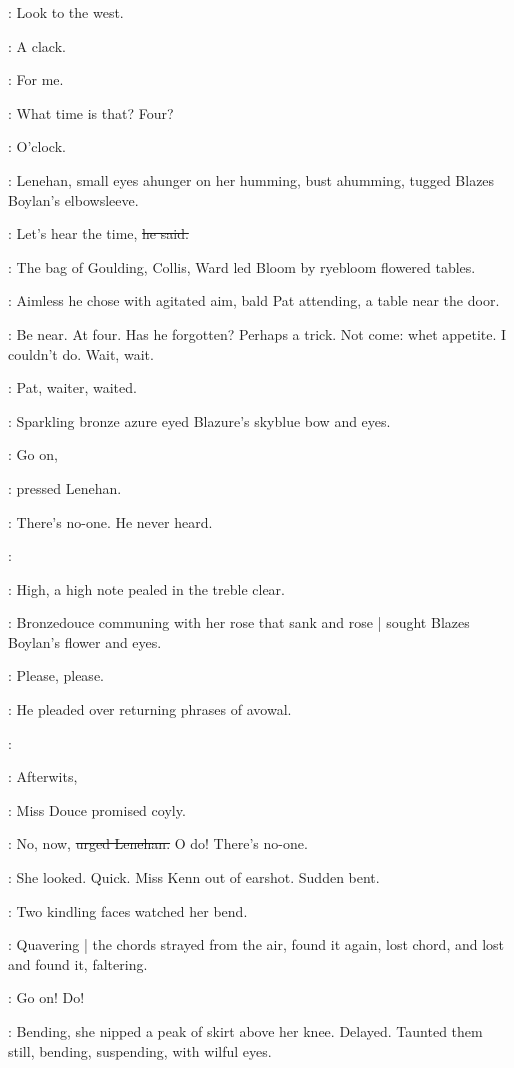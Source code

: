 \BloomInt:
Look to the west.

:
A clack.

\BloomInt:
For me.

\boylan:
What time is that?
Four?

:
O'clock.

:
Lenehan,
small eyes ahunger on her humming,
bust ahumming,
tugged Blazes Boylan's elbowsleeve.

\lenehan:
Let's hear the time,
\sout{he said.}

:
The bag of Goulding,
Collis,
Ward
led Bloom by ryebloom flowered tables.

:
Aimless he chose with agitated aim,
bald Pat attending,
a table near the door.

\BloomInt:
Be near.
At four.
Has he forgotten?
Perhaps a trick.
Not come:
whet appetite.
I couldn't do.
Wait,
wait.

:
Pat,
waiter,
waited.

:
Sparkling bronze azure eyed Blazure's skyblue bow and eyes.

\lenehan:
Go on,

:
pressed Lenehan.

\lenehan:
There's no-one.
He never heard.

\simon:

:
High,
a high note pealed in the treble clear.

:
Bronzedouce communing with her rose that sank and rose |
sought Blazes Boylan's flower and eyes.

\lenehan:
Please,
please.

:
He pleaded over returning phrases of avowal.

\simon:

\MissD:
Afterwits,

:
Miss Douce promised coyly.

\lenehan:
No,
now,
\sout{urged Lenehan.}
O do!
There's no-one.

:
She looked.
Quick.
Miss Kenn out of earshot.
Sudden bent.

:
Two kindling faces watched her bend.

:
Quavering |
the chords strayed from the air,
found it again,
lost chord,
and lost and found it,
faltering.

\lenehan:
Go on!
Do!

:
Bending,
she nipped a peak of skirt above her knee.
Delayed.
Taunted them still,
bending,
suspending,
with wilful eyes.

